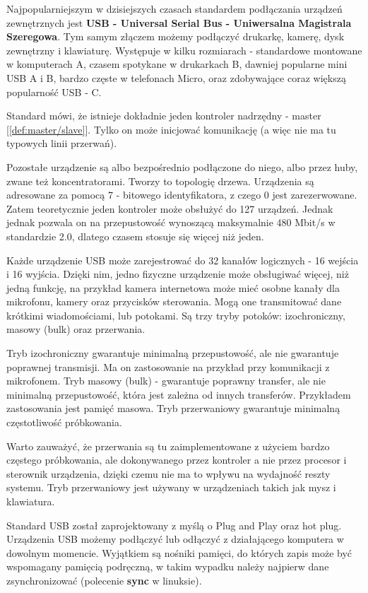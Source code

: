 \documentclass[shortabstract,inz]{iithesis}
\begin{document}
Najpopularniejszym w dzisiejszych czasach standardem podłączania urządzeń
zewnętrznych jest \textbf{USB - Universal Serial Bus - Uniwersalna Magistrala
Szeregowa}. Tym samym złączem możemy podłączyć drukarkę, kamerę, dysk
zewnętrzny i klawiaturę. Występuje w kilku rozmiarach - standardowe montowane
w komputerach A, czasem spotykane w drukarkach B, dawniej popularne mini USB A i
B, bardzo częste w telefonach Micro, oraz zdobywające coraz większą
popularność USB - C. 

Standard mówi, że istnieje dokładnie jeden kontroler nadrzędny - master [\ref{def:master/slave}]. 
Tylko on może inicjować komunikację (a więc nie ma tu typowych linii przerwań). 

Pozostałe urządzenie są albo bezpośrednio
podłączone do niego, albo przez huby, zwane też koncentratorami. Tworzy to
topologię drzewa. Urządzenia są adresowane za pomocą 7 - bitowego identyfikatora, 
z czego 0 jest zarezerwowane. Zatem teoretycznie jeden
kontroler może obsłużyć do 127 urządzeń. Jednak jednak pozwala on na 
przepustowość wynoszącą maksymalnie 480 Mbit/s w standardzie 2.0, dlatego
czasem stosuje się więcej niż jeden.

Każde urządzenie USB może zarejestrować do 32 kanałów logicznych - 16 wejścia i 16 wyjścia.
Dzięki nim, jedno fizyczne urządzenie może obsługiwać więcej,
niż jedną funkcję, na przykład kamera internetowa może mieć osobne
kanały dla mikrofonu, kamery oraz przycisków sterowania. Mogą one
transmitować dane krótkimi wiadomościami, lub potokami. Są trzy tryby
potoków: izochroniczny, masowy (bulk) oraz przerwania.

Tryb izochroniczny gwarantuje minimalną przepustowość, ale nie
gwarantuje poprawnej transmisji. Ma on zastosowanie na przykład przy
komunikacji z mikrofonem. Tryb masowy (bulk) - gwarantuje poprawny
transfer, ale nie minimalną przepustowość, która jest zależna od
innych transferów.  Przykładem zastosowania jest pamięć masowa. Tryb
przerwaniowy gwarantuje minimalną częstotliwość
próbkowania. 

Warto zauważyć, że przerwania są tu zaimplementowane z
użyciem bardzo częstego próbkowania, ale dokonywanego przez
kontroler a nie przez procesor i sterownik urządzenia, dzięki czemu
nie ma to wpływu na wydajność reszty systemu. Tryb przerwaniowy jest
używany w urządzeniach takich jak mysz i klawiatura.

Standard USB został zaprojektowany z myślą o Plug and Play oraz hot plug. 
Urządzenia USB możemy podłączyć lub odłączyć z działającego komputera
w dowolnym momencie. Wyjątkiem są nośniki pamięci, do
których zapis może być wspomagany pamięcią podręczną, w takim wypadku należy
najpierw dane zsynchronizować (polecenie \textbf{sync} w linuksie). 
\end{document}
